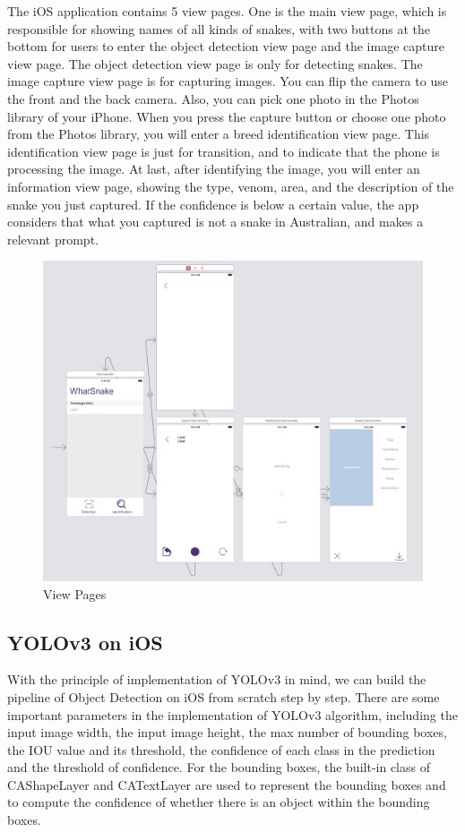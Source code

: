 \documentclass{article}
\begin{document}
The iOS application contains 5 view pages. One is the main view page, which is responsible for showing names of all kinds of snakes, with two buttons at the bottom for users to enter the object detection view page and the image capture view page. The object detection view page is only for detecting snakes. The image capture view page is for capturing images. You can flip the camera to use the front and the back camera. Also, you can pick one photo in the Photos library of your iPhone. When you press the capture button or choose one photo from the Photos library, you will enter a breed identification view page. This identification view page is just for transition, and to indicate that the phone is processing the image. At last, after identifying the image, you will enter an information view page, showing the type, venom, area, and the description of the snake you just captured. If the confidence is below a certain value, the app considers that what you captured is not a snake in Australian, and makes a relevant prompt.

\begin{figure}[h]
\centering
\includegraphics[scale=0.7]{viewpage.jpg}
\caption{View Pages}
\label{fig:viewpage}
\end{figure}

\subsection{YOLOv3 on iOS}

With the principle of implementation of YOLOv3 in mind, we can build the pipeline of Object Detection on iOS from scratch step by step. There are some important parameters in the implementation of YOLOv3 algorithm, including the input image width, the input image height, the max number of bounding boxes, the IOU value and its threshold, the confidence of each class in the prediction and the threshold of confidence. For the bounding boxes, the built-in class of CAShapeLayer and CATextLayer are used to represent the bounding boxes and to compute the confidence of whether there is an object within the bounding boxes.
\end{document}
